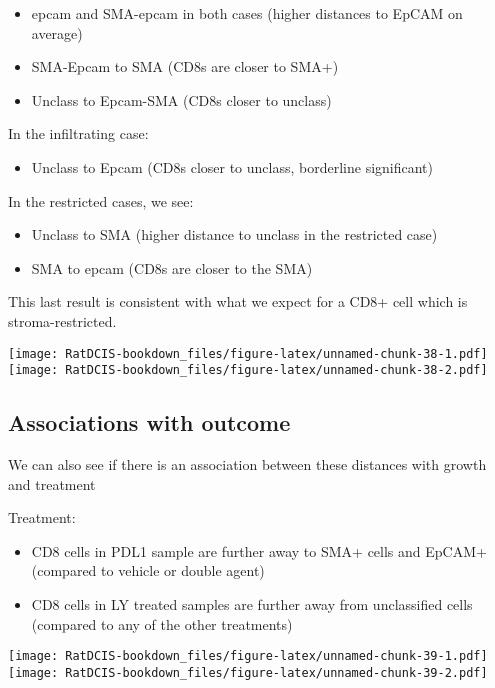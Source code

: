 \documentclass[
]{book}
\providecommand{\tightlist}{%
  \setlength{\itemsep}{0pt}\setlength{\parskip}{0pt}}
\begin{document}
\begin{itemize}
\tightlist
\item
  epcam and SMA-epcam in both cases (higher distances to EpCAM on average)
\item
  SMA-Epcam to SMA (CD8s are closer to SMA+)
\item
  Unclass to Epcam-SMA (CD8s closer to unclass)
\end{itemize}

In the infiltrating case:

\begin{itemize}
\tightlist
\item
  Unclass to Epcam (CD8s closer to unclass, borderline significant)
\end{itemize}

In the restricted cases, we see:

\begin{itemize}
\tightlist
\item
  Unclass to SMA (higher distance to unclass in the restricted case)
\item
  SMA to epcam (CD8s are closer to the SMA)
\end{itemize}

This last result is consistent with what we expect for a CD8+ cell which is stroma-restricted.

\texttt{[image: RatDCIS-bookdown\_files/figure-latex/unnamed-chunk-38-1.pdf]} \texttt{[image: RatDCIS-bookdown\_files/figure-latex/unnamed-chunk-38-2.pdf]}

\hypertarget{associations-with-outcome}{%
\subsection{Associations with outcome}\label{associations-with-outcome}}

We can also see if there is an association between these distances with growth and treatment

Treatment:

\begin{itemize}
\tightlist
\item
  CD8 cells in PDL1 sample are further away to SMA+ cells and EpCAM+ (compared to vehicle or double agent)
\item
  CD8 cells in LY treated samples are further away from unclassified cells (compared to any of the other treatments)
\end{itemize}

\texttt{[image: RatDCIS-bookdown\_files/figure-latex/unnamed-chunk-39-1.pdf]} \texttt{[image: RatDCIS-bookdown\_files/figure-latex/unnamed-chunk-39-2.pdf]}
\end{document}
